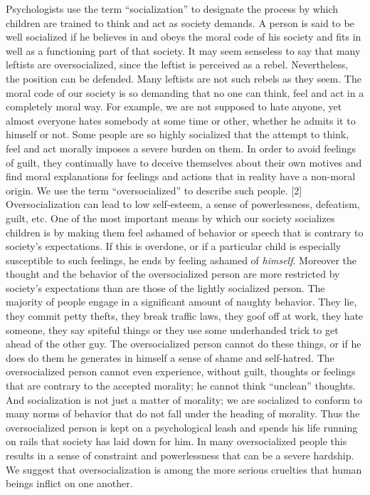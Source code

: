  Psychologists use the term “socialization” to designate the proc\-ess by which children are trained to think and act as society demands. A person is said to be well socialized if he believes in and obeys the moral code of his society and fits in well as a functioning part of that society. It may seem senseless to say that many leftists are oversocialized, since the leftist is perceived as a rebel. Nevertheless, the position can be defended. Many leftists are not such rebels as they seem.
 The moral code of our society is so demanding that no one can think, feel and act in a completely moral way. For example, we are not supposed to hate anyone, yet almost everyone hates somebody at some time or other, whether he admits it to himself or not. Some people are so highly socialized that the attempt to think, feel and act morally imposes a severe burden on them. In order to avoid feelings of guilt, they continually have to deceive themselves about their own motives and find moral explanations for feelings and actions that in reality have a non-moral origin. We use the term “oversocialized” to describe such people. [2]
 Oversocialization can lead to low self-esteem, a sense of powerlessness, defeatism, guilt, etc. One of the most important means by which our society socializes children is by making them feel ashamed of behavior or speech that is contrary to society’s expectations. If this is overdone, or if a particular child is especially susceptible to such feelings, he ends by feeling ashamed of {\em himself}. Moreover the thought and the behavior of the oversocialized person are more restricted by society’s expectations than are those of the lightly socialized person. The majority of people engage in a significant amount of naughty behavior. They lie, they commit petty thefts, they break traffic laws, they goof off at work, they hate someone, they say spiteful things or they use some underhanded trick to get ahead of the other guy. The oversocialized person cannot do these things, or if he does do them he generates in himself a sense of shame and self-hatred. The oversocialized person cannot even experience, without guilt, thoughts or feelings that are contrary to the accepted morality; he cannot think “unclean” thoughts. And socialization is not just a matter of morality; we are socialized to conform to many norms of behavior that do not fall under the heading of morality. Thus the oversocialized person is kept on a psychological leash and spends his life running on rails that society has laid down for him. In many oversocialized people this results in a sense of constraint and powerlessness that can be a severe hardship. We suggest that oversocialization is among the more serious cruelties that human beings inflict on one another.
